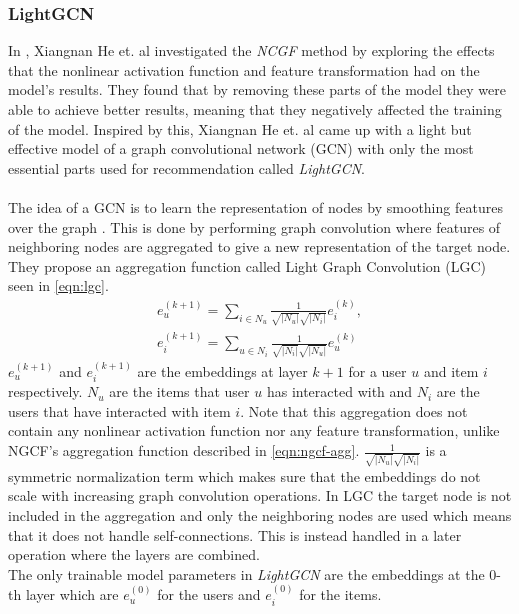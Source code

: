 \subsubsection{LightGCN}
In \cite{LightGCN}, Xiangnan He et. al investigated the \textit{NCGF} method by exploring the effects that the nonlinear activation function and feature transformation had on the model's results.
They found that by removing these parts of the  model they were able to achieve better results, meaning that they negatively affected the training of the model.
Inspired by this, Xiangnan He et. al came up with a light but effective model of a graph convolutional network (GCN) with only the most essential parts used for recommendation called \textit{LightGCN}.
\\\\
The idea of a GCN is to learn the representation of nodes by smoothing features over the graph \cite{LightGCN}.
This is done by performing graph convolution where features of neighboring nodes are aggregated to give a new representation of the target node.
They propose an aggregation function called Light Graph Convolution (LGC) seen in \autoref{eqn:lgc}.
\begin{align}\label{eqn:lgc}
    e_{u}^{(k+1)}=\sum_{i\in N_u}\frac{1}{\sqrt{\left | N_u \right |}\sqrt{\left | N_i \right |}}e_{i}^{(k)},\nonumber\\
    e_{i}^{(k+1)}=\sum_{u\in N_i}\frac{1}{\sqrt{\left | N_i \right |}\sqrt{\left | N_u \right |}}e_{u}^{(k)}
\end{align}
$e_{u}^{(k+1)}$ and $e_{i}^{(k+1)}$ are the embeddings at layer $k+1$ for a user $u$ and item $i$ respectively.
$N_u$ are the items that user $u$ has interacted with and $N_i$ are the users that have interacted with item $i$.
Note that this aggregation does not contain any nonlinear activation function nor any feature transformation, unlike NGCF's aggregation function described in \autoref{eqn:ngcf-agg}.
$\frac{1}{\sqrt{\left | N_u \right |}\sqrt{\left | N_i \right |}}$ is a symmetric normalization term which makes sure that the embeddings do not scale with increasing graph convolution operations.
In LGC the target node is not included in the aggregation and only the neighboring nodes are used which means that it does not handle self-connections.
This is instead handled in a later operation where the layers are combined.
\\
The only trainable model parameters in \textit{LightGCN} are the embeddings at the 0-th layer which are $e_{u}^{(0)}$ for the users and $e_{i}^{(0)}$ for the items.

